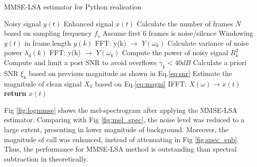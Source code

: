 \begin{algorithm}
	\renewcommand{\algorithmicrequire}{\textbf{Input:}}
	\renewcommand{\algorithmicensure}{\textbf{Output:}}
	\caption{MMSE-LSA estimator for Python realisation}
	\label{alg:mmse}
	\begin{algorithmic}[1]
		\REQUIRE Noisy signal $y(t)$
		\ENSURE Enhanced signal $x(t)$
		\STATE Calculate the number of frames $N$ based on sampling frequency $f_s$
		\STATE Assume first 6 frames is noise/silence
		\STATE Windowing $y(t)$ in frame length $y(k)$
		\STATE FFT: y(k) $\rightarrow$ $Y(\omega_k)$
		\STATE Calculate variance of noise power $\lambda_d(k)$
		\ENDFOR 
		\STATE FFT: y(k) $\rightarrow$ $Y(\omega_k)$
		\STATE Compute the power of noisy signal $R_k^2$
		\STATE Compute and limit a post SNR to avoid overflows $\gamma_k<40 dB$
		\STATE Calculate a priori SNR $\xi_k$ based on previous magnitude as shown in Eq.\ref{eq:snr}
		\STATE Estimate the magnitude of clean signal $X_k$ based on Eq.\ref{eq:magni}
		\ENDFOR
		\STATE IFFT: $X(\omega)\rightarrow x(t)$
		\STATE \textbf{return} $x(t)$
	\end{algorithmic}  
\end{algorithm}
Fig \ref{fig:logmmse} shows the mel-spectrogram after applying the MMSE-LSA estimator. Comparing with Fig \ref{fig:mel_spec}, the noise level was reduced to a large extent, presenting in lower magnitude of background. Moreover, the magnitude of call was enhanced, instead of attenuating in Fig \ref{fig:spec_sub}. Thus, the performance for MMSE-LSA method is outstanding than spectral subtraction in theoretically.
